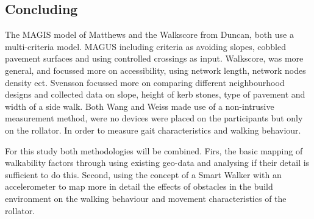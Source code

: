 \subsection{Concluding}
The MAGIS model of Matthews and the Walkscore from Duncan, both use a multi-criteria model. MAGUS including criteria as avoiding slopes, cobbled pavement surfaces and using controlled crossings as input. Walkscore, was more general, and focussed more on accessibility, using network length, network nodes density ect. Svensson focussed more on comparing different neighbourhood designs and collected data on slope, height of kerb stones, type of pavement and width of a side walk. Both Wang and Weiss made use of a non-intrusive measurement method, were no devices were placed on the participants but only on the rollator. In order to measure gait characteristics and walking behaviour. 

For this study both methodologies will be combined. Firs, the basic mapping of walkability factors through using existing geo-data and analysing if their detail is sufficient to do this. Second, using the concept of a Smart Walker with an accelerometer to map more in detail the effects of obstacles in the build environment on the walking behaviour and movement characteristics of the rollator. 